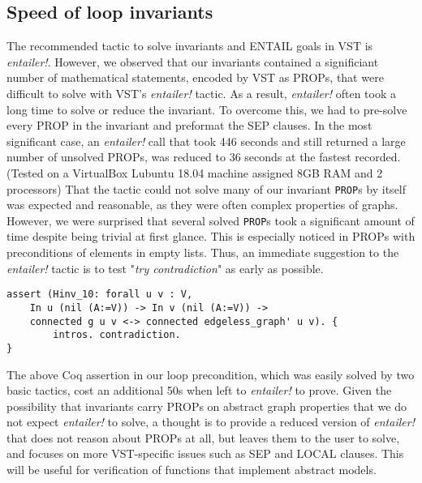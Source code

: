 \subsection{Speed of loop invariants}
The recommended tactic to solve invariants and ENTAIL goals in VST is \textit{entailer!}. However, we observed that our invariants contained a significiant number of mathematical statements, encoded by VST as PROPs, that were difficult to solve with VST's \textit{entailer!} tactic. As a result, \textit{entailer!} often took a long time to solve or reduce the invariant. To overcome this, we had to pre-solve every PROP in the invariant and preformat the SEP clauses. In the most significant case, an \textit{entailer!} call that took 446 seconds and still returned a large number of unsolved PROPs, was reduced to 36 seconds at the fastest recorded. (Tested on a VirtualBox Lubuntu 18.04 machine assigned 8GB RAM and 2 processors)
\newline\newline
That the tactic could not solve many of our invariant \texttt{PROP}s by itself was expected and reasonable, as they were often complex properties of graphs. However, we were surprised that several solved \texttt{PROP}s took a significant amount of time despite being trivial at first glance. This is especially noticed in PROPs with preconditions of elements in empty lists. Thus, an immediate suggestion to the \textit{entailer!} tactic is to test "\textit{try contradiction}" as early as possible.
\begin{lstlisting}
assert (Hinv_10: forall u v : V,
	In u (nil (A:=V)) -> In v (nil (A:=V)) ->
	connected g u v <-> connected edgeless_graph' u v). {
		intros. contradiction.
}
\end{lstlisting}
The above Coq assertion in our loop precondition, which was easily solved by two basic tactics, cost an additional 50s when left to \textit{entailer!} to prove.
\newline\newline
Given the possibility that invariants carry PROPs on abstract graph properties that we do not expect \textit{entailer!} to solve, a thought is to provide a reduced version of \textit{entailer!} that does not reason about PROPs at all, but leaves them to the user to solve, and focuses on more VST-specific issues such as SEP and LOCAL clauses. This will be useful for verification of functions that implement abstract models.

